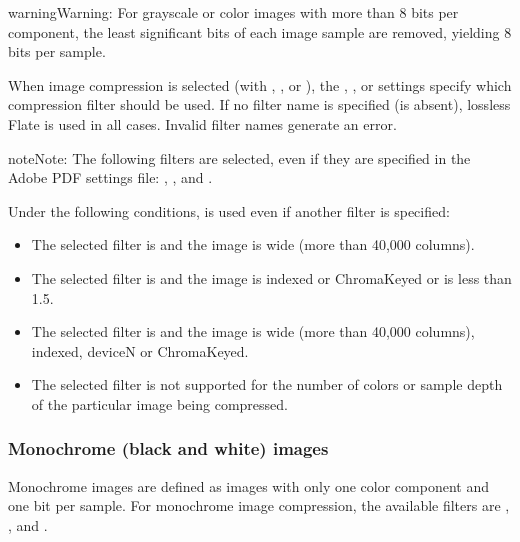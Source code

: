 \documentclass[letterpaper,12pt,english,openany,oneside]{sphinxmanual}
\begin{document}
\begin{sphinxadmonition}{warning}{Warning:}
For grayscale or color images with more than 8 bits per component, the least significant bits of each image sample are removed, yielding 8 bits per sample.
\end{sphinxadmonition}

When image compression is selected (with  ,  , or  ), the  ,  , or  settings specify which compression filter should be used. If no filter name is specified (is absent), lossless Flate is used in all cases. Invalid filter names generate an error.

\begin{sphinxadmonition}{note}{Note:}
The following filters are  selected, even if they are specified in the Adobe PDF settings file:  ,  , and  .
\end{sphinxadmonition}

Under the following conditions,  is used even if another filter is specified:
\begin{itemize}
\item {} 
The selected filter is  and the image is wide (more than 40,000 columns).

\item {} 
The selected filter is  and the image is indexed or ChromaKeyed or  is less than 1.5.

\item {} 
The selected filter is  and the image is wide (more than 40,000 columns), indexed, deviceN or ChromaKeyed.

\item {} 
The selected filter is not supported for the number of colors or sample depth of the particular image being compressed.

\end{itemize}




\subsubsection{Monochrome (black and white) images}
\label{\detokenize{PDF_Create_UsingSettings:monochrome-black-and-white-images}}
Monochrome images are defined as images with only one color component and one bit per sample. For monochrome image compression, the available filters are  ,  , and  .
\end{document}
